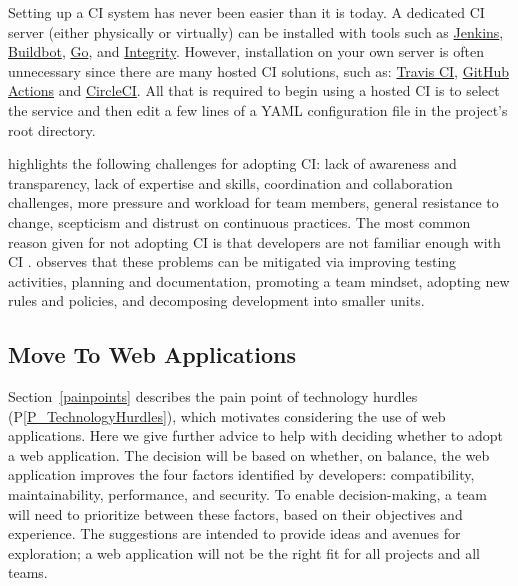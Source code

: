 \documentclass[final, 3p, times, authoryear]{elsarticle}
\newcommand{\ppref}[1]{P\ref{#1}}
\begin{document}
Setting up a CI system has never been easier than it is today.  A dedicated CI
server (either physically or virtually) can be installed with tools such as
\href{https://www.jenkins.io/} {Jenkins}, \href{http://buildbot.net/}
{Buildbot}, \href{https://www.gocd.org/} {Go}, and
\href{http://integrity.github.io/} {Integrity}. However, installation on your
own server is often unnecessary since there are many hosted CI solutions, such
as: \href{https://travis-ci.org/} {Travis CI},
\href{https://github.com/features/actions} {GitHub Actions} and
\href{https://circleci.com/} {CircleCI}.  All that is required to begin using a
hosted CI is to select the service and then edit a few lines of a YAML
configuration file in the project's root directory.

\citet{ShahinEtAl2017} highlights the following challenges for adopting CI: lack
of awareness and transparency, lack of expertise and skills, coordination and
collaboration challenges, more pressure and workload for team members, general
resistance to change, scepticism and distrust on continuous practices. The most
common reason given for not adopting CI is that developers are not familiar
enough with CI \citep{HiltonEtAl2016}.  \citet{ShahinEtAl2017} observes that
these problems can be mitigated via improving testing activities, planning and
documentation, promoting a team mindset, adopting new rules and policies, and
decomposing development into smaller units.

\subsection{Move To Web Applications} \label{sec_webapps}

Section~\ref{painpoints} describes the pain point of technology hurdles
(\ppref{P_TechnologyHurdles}), which motivates considering the use of web
applications. Here we give further advice to help with deciding whether to adopt
a web application. The decision will be based on whether, on balance, the web
application improves the four factors identified by developers: compatibility,
maintainability, performance, and security. To enable decision-making, a team
will need to prioritize between these factors, based on their objectives and
experience. The suggestions are intended to provide ideas and avenues for
exploration; a web application will not be the right fit for all projects and
all teams.
\end{document}
